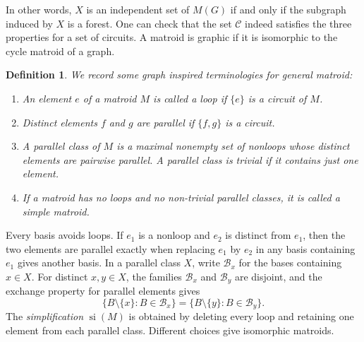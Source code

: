 \documentclass[11pt,letterpaper]{article}
\newcommand{\B}{\mathcal{B}}
\newcommand{\C}{\mathcal{C}}
\DeclareMathOperator{\si}{si}
\theoremstyle{appendix-result}
\theoremstyle{appendix-definition}
\newtheorem{definition}[theorem]{Definition}
\begin{document}
In other words, $X$ is an independent set of $M(G)$ if and only if the subgraph induced by $X$ is a forest. One can check that the set $\C$ indeed satisfies the three properties for a set of circuits.
A matroid is graphic if it is isomorphic to the cycle matroid of a graph.
\begin{definition}
    We record some graph inspired terminologies for general matroid:
    \begin{enumerate}
        \item An element $e$ of a matroid $M$ is called a loop if $\{e\}$ is a circuit of $M$.
        \item Distinct elements $f$ and $g$ are parallel if $\{f,g\}$ is a circuit.
        \item A parallel class of $M$ is a maximal nonempty set of nonloops whose distinct elements are pairwise parallel. A parallel class is trivial if it contains just one element.
        \item If a matroid has no loops and no non-trivial parallel classes, it is called a simple matroid.
    \end{enumerate}
\end{definition}
Every basis avoids loops. If $e_1$ is a nonloop and $e_2$ is distinct from $e_1$, then the two elements are parallel exactly when replacing $e_1$ by $e_2$ in any basis containing $e_1$ gives another basis. In a parallel class $X$, write $\B_x$ for the bases containing $x\in X$. For distinct $x,y\in X$, the families $\B_x$ and $\B_y$ are disjoint, and the exchange property for parallel elements gives
\[
    \{B\setminus\{x\}:B\in\B_x\}=\{B\setminus\{y\}:B\in\B_y\}.
\]
The \emph{simplification} $\si(M)$ is obtained by deleting every loop and retaining one element from each parallel class. Different choices give isomorphic matroids.
\end{document}
